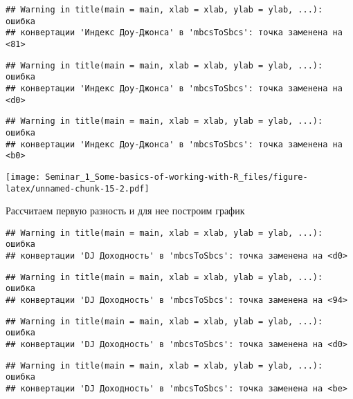 \documentclass[
]{article}
\newenvironment{Shaded}{\begin{snugshade}}{\end{snugshade}}
\newcommand{\AttributeTok}[1]{\textcolor[rgb]{0.13,0.29,0.53}{#1}}
\newcommand{\FunctionTok}[1]{\textcolor[rgb]{0.13,0.29,0.53}{\textbf{#1}}}
\newcommand{\NormalTok}[1]{#1}
\newcommand{\OtherTok}[1]{\textcolor[rgb]{0.56,0.35,0.01}{#1}}
\newcommand{\SpecialCharTok}[1]{\textcolor[rgb]{0.81,0.36,0.00}{\textbf{#1}}}
\newcommand{\StringTok}[1]{\textcolor[rgb]{0.31,0.60,0.02}{#1}}
\begin{document}
\begin{verbatim}
## Warning in title(main = main, xlab = xlab, ylab = ylab, ...): ошибка
## конвертации 'Индекс Доу-Джонса' в 'mbcsToSbcs': точка заменена на <81>
\end{verbatim}

\begin{verbatim}
## Warning in title(main = main, xlab = xlab, ylab = ylab, ...): ошибка
## конвертации 'Индекс Доу-Джонса' в 'mbcsToSbcs': точка заменена на <d0>
\end{verbatim}

\begin{verbatim}
## Warning in title(main = main, xlab = xlab, ylab = ylab, ...): ошибка
## конвертации 'Индекс Доу-Джонса' в 'mbcsToSbcs': точка заменена на <b0>
\end{verbatim}

\texttt{[image: Seminar\_1\_Some-basics-of-working-with-R\_files/figure-latex/unnamed-chunk-15-2.pdf]}

Рассчитаем первую разность и для нее построим график

\begin{Shaded}
\end{Shaded}

\begin{verbatim}
## Warning in title(main = main, xlab = xlab, ylab = ylab, ...): ошибка
## конвертации 'DJ Доходность' в 'mbcsToSbcs': точка заменена на <d0>
\end{verbatim}

\begin{verbatim}
## Warning in title(main = main, xlab = xlab, ylab = ylab, ...): ошибка
## конвертации 'DJ Доходность' в 'mbcsToSbcs': точка заменена на <94>
\end{verbatim}

\begin{verbatim}
## Warning in title(main = main, xlab = xlab, ylab = ylab, ...): ошибка
## конвертации 'DJ Доходность' в 'mbcsToSbcs': точка заменена на <d0>
\end{verbatim}

\begin{verbatim}
## Warning in title(main = main, xlab = xlab, ylab = ylab, ...): ошибка
## конвертации 'DJ Доходность' в 'mbcsToSbcs': точка заменена на <be>
\end{verbatim}
\end{document}

